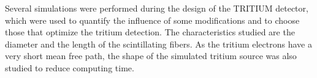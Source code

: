 Several simulations were performed during the design of the TRITIUM detector, which were used to quantify the influence of some modifications and to choose those that optimize the tritium detection. The characteristics studied are the diameter and the length of the scintillating fibers. As the tritium electrons have a very short mean free path, the shape of the simulated tritium source was also studied to reduce computing time. 